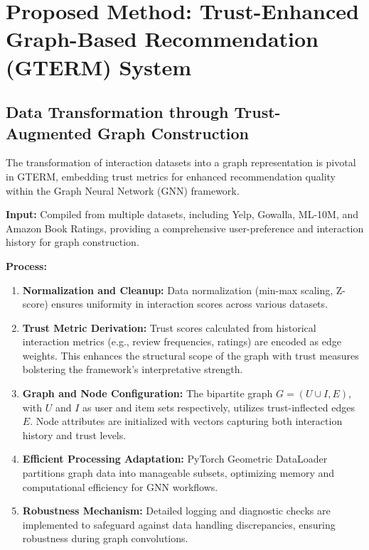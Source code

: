 \section{Proposed Method: Trust-Enhanced Graph-Based Recommendation (GTERM) System}

\subsection{Data Transformation through Trust-Augmented Graph Construction}

The transformation of interaction datasets into a graph representation is pivotal in GTERM, embedding trust metrics for enhanced recommendation quality within the Graph Neural Network (GNN) framework.

\textbf{Input:} Compiled from multiple datasets, including Yelp, Gowalla, ML-10M, and Amazon Book Ratings, providing a comprehensive user-preference and interaction history for graph construction.

\textbf{Process:}
\begin{enumerate}
    \item \textbf{Normalization and Cleanup:} Data normalization (min-max scaling, Z-score) ensures uniformity in interaction scores across various datasets.
    
    \item \textbf{Trust Metric Derivation:} Trust scores calculated from historical interaction metrics (e.g., review frequencies, ratings) are encoded as edge weights. This enhances the structural scope of the graph with trust measures bolstering the framework's interpretative strength.
    
    \item \textbf{Graph and Node Configuration:} The bipartite graph \(G = (U \cup I, E)\), with \(U\) and \(I\) as user and item sets respectively, utilizes trust-inflected edges \(E\). Node attributes are initialized with vectors capturing both interaction history and trust levels.

    \item \textbf{Efficient Processing Adaptation:} PyTorch Geometric DataLoader partitions graph data into manageable subsets, optimizing memory and computational efficiency for GNN workflows.

    \item \textbf{Robustness Mechanism:} Detailed logging and diagnostic checks are implemented to safeguard against data handling discrepancies, ensuring robustness during graph convolutions.
\end{enumerate}


